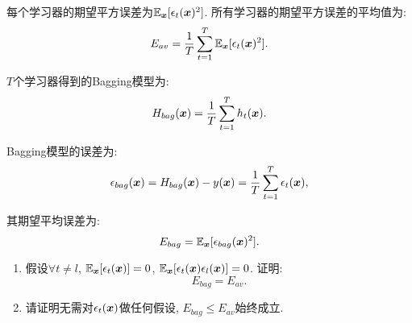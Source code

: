 \documentclass[answers]{exam}  %
\begin{document}
\begin{questions}
每个学习器的期望平方误差为$\mathbb{E}_{{\boldsymbol{x}}}[\epsilon_t({\boldsymbol{x}})^2]$. 所有学习器的期望平方误差的平均值为:
\begin{equation}
E_{av}=\frac{1}{T}\sum_{t=1}^T \mathbb{E}_{{\boldsymbol{x}}}[\epsilon_t({\boldsymbol{x}})^2].
\end{equation}

$T$个学习器得到的Bagging模型为:
\begin{equation}
H_{bag}({\boldsymbol{x}})=\frac{1}{T}\sum_{t=1}^T h_t({\boldsymbol{x}}).
\end{equation}

Bagging模型的误差为:
\begin{equation}
\epsilon_{bag}({\boldsymbol{x}})=H_{bag}({\boldsymbol{x}})-y({\boldsymbol{x}})=\frac{1}{T}\sum_{t=1}^T \epsilon_t({\boldsymbol{x}}),
\end{equation}

其期望平均误差为:
\begin{equation}
E_{bag}=\mathbb{E}_{{\boldsymbol{x}}}[\epsilon_{bag}({\boldsymbol{x}})^2].
\end{equation}

\begin{enumerate}
\item 假设$\forall t\neq l$, $\mathbb{E}_{{\boldsymbol{x}}}[\epsilon_t({\boldsymbol{x}})]=0$, $ \mathbb{E}_{{\boldsymbol{x}}}[\epsilon_t({\boldsymbol{x}})\epsilon_l({\boldsymbol{x}})]=0$. 证明:
\begin{equation}
E_{bag}=E_{av}.
\end{equation}

\item 请证明无需对$\epsilon_t({\boldsymbol{x}})$做任何假设, $E_{bag}\leq E_{av}$始终成立. 
\end{enumerate}

\begin{solution}
\end{solution}


\end{questions}
\end{document}
